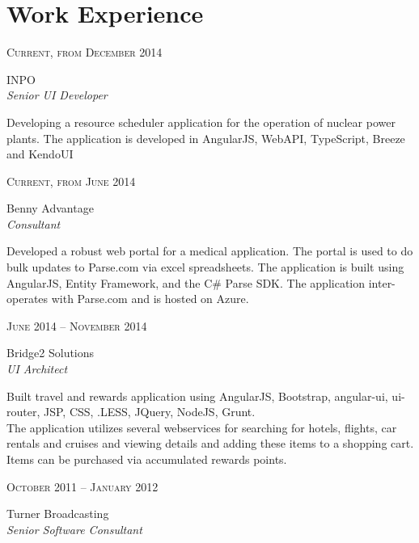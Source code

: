\documentclass[10pt]{article} %
\begin{document}
{\begin{minipage}[t]{0.5\textwidth}
\section{Work Experience} 


{\raggedleft\textsc{ Current, from December 2014 }\par}

{\raggedright\large INPO \\
\textit{ Senior UI Developer }\\[5pt]}

\normalsize{ Developing a resource scheduler application for the operation of nuclear power plants.  The application is developed in AngularJS, WebAPI, TypeScript, Breeze and KendoUI }\\

{\raggedleft\textsc{ Current, from June 2014 }\par}

{\raggedright\large Benny Advantage \\
\textit{ Consultant }\\[5pt]}

\normalsize{ Developed a robust web portal for a medical application.  The portal is used to do bulk updates to Parse.com via excel spreadsheets.  The application is built using AngularJS, Entity Framework, and the C\# Parse SDK.  The application inter-operates with Parse.com and is hosted on Azure. }\\

{\raggedleft\textsc{ June 2014 -- November 2014 }\par}

{\raggedright\large Bridge2 Solutions \\
\textit{ UI Architect }\\[5pt]}

\normalsize{ Built travel and rewards application using AngularJS, Bootstrap, angular-ui, ui-router, JSP, CSS, .LESS, JQuery, NodeJS, Grunt.\\The application utilizes several webservices for searching for hotels, flights, car rentals and cruises and viewing details and adding these items to a shopping cart.  Items can be purchased via accumulated rewards points. }\\

{\raggedleft\textsc{ October 2011 -- January 2012 }\par}

{\raggedright\large Turner Broadcasting \\
\textit{ Senior Software Consultant }\\[5pt]}


\end{minipage}}
\end{document}
